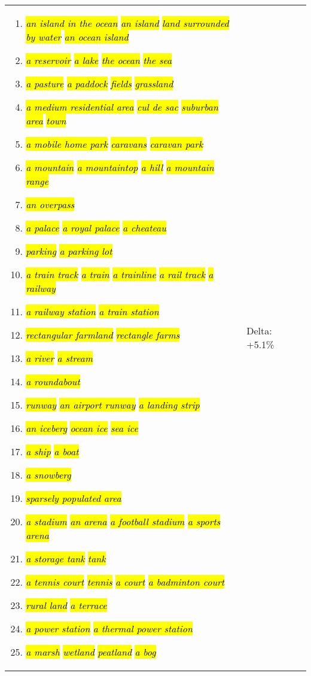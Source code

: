 \documentclass[10pt,twocolumn,letterpaper]{article}
\DeclareRobustCommand{\hlgrey}[1]{{\sethlcolor{light_gray}\hl{#1}}}
\newcommand{\clsfmt}[1]{\hlgrey{\textit{#1}}}
\begin{document}
\begin{longtable}[h]{p{}p{}p{}}
\begin{enumerate}[itemsep=1pt,topsep=1pt,leftmargin=12pt]
	\item \clsfmt{an island in the ocean}  \clsfmt{  an island}  \clsfmt{  land surrounded by water}  \clsfmt{  an ocean island}
	\item \clsfmt{a reservoir}  \clsfmt{  a lake}  \clsfmt{  the ocean}  \clsfmt{  the sea}
	\item \clsfmt{a pasture}  \clsfmt{  a paddock}  \clsfmt{  fields}  \clsfmt{  grassland}
	\item \clsfmt{a medium residential area}  \clsfmt{  cul de sac}  \clsfmt{  suburban area}  \clsfmt{  town}
	\item \clsfmt{a mobile home park}  \clsfmt{  caravans}  \clsfmt{  caravan park}
	\item \clsfmt{a mountain}  \clsfmt{  a mountaintop}  \clsfmt{  a hill}  \clsfmt{  a mountain range}
	\item \clsfmt{an overpass}
	\item \clsfmt{a palace}  \clsfmt{  a royal palace}  \clsfmt{  a cheateau}
	\item \clsfmt{parking}  \clsfmt{  a parking lot}
	\item \clsfmt{a train track}  \clsfmt{  a train}  \clsfmt{  a trainline}  \clsfmt{  a rail track}  \clsfmt{  a railway}
	\item \clsfmt{a railway station}  \clsfmt{  a train station}
	\item \clsfmt{rectangular farmland}  \clsfmt{  rectangle farms}
	\item \clsfmt{a river}  \clsfmt{  a stream}
	\item \clsfmt{a roundabout}
	\item \clsfmt{runway}  \clsfmt{  an airport runway}  \clsfmt{  a landing strip}
	\item \clsfmt{an iceberg}  \clsfmt{  ocean ice}  \clsfmt{  sea ice}
	\item \clsfmt{a ship}  \clsfmt{  a boat}
	\item \clsfmt{a snowberg}
	\item \clsfmt{sparsely populated area}
	\item \clsfmt{a stadium}  \clsfmt{  an arena}  \clsfmt{  a football stadium}  \clsfmt{  a sports arena}
	\item \clsfmt{a storage tank}  \clsfmt{  tank}
	\item \clsfmt{a tennis court}  \clsfmt{  tennis}  \clsfmt{  a court}  \clsfmt{  a badminton court}
	\item \clsfmt{rural land}  \clsfmt{  a terrace}
	\item \clsfmt{a power station}  \clsfmt{  a thermal power station}
	\item \clsfmt{a marsh}  \clsfmt{  wetland}  \clsfmt{  peatland}  \clsfmt{  a bog}
\end{enumerate}
\normalsize
&
Delta: \small 
+5.1\%
\normalsize \\


\end{longtable}
\end{document}
